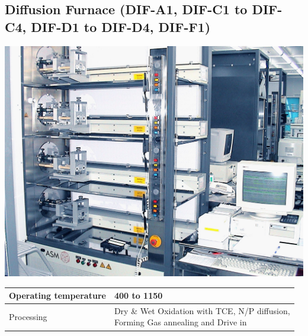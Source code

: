 \subsection{Diffusion Furnace (DIF-A1, DIF-C1 to DIF-C4, DIF-D1 to DIF-D4, DIF-F1)}\label{diffusion_furnace_machine}
\WaferClean\WaferSemiClean\WaferNonStandard

\begin{minipage}[H]{\MachinePictureMiniPageWidth}
	\includegraphics[width=\MachinePictureWidth]{pictures_machines/diffusion_furnace.png}
\end{minipage}\begin{minipage}[H]{\MachineTextMiniPageWidth}
	\begin{tabular}{|p{2cm}|p{8cm}|}
		\hline
		Operating temperature &
		400 to 1150 \degreesC \\
		\hline
		Processing &
		\makecell{Dry \& Wet Oxidation with TCE, N/P diffusion, \\
		Forming Gas annealing and Drive in} \\
		\hline
	\end{tabular}
\end{minipage}
